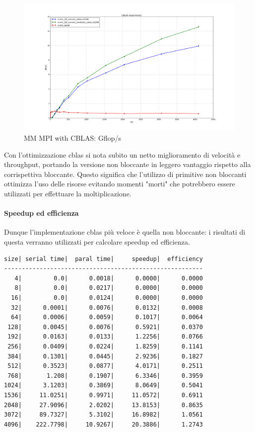 \begin{figure}[htbp]
    \begin{center}
        \includegraphics[width=15cm]{immagini/cblas_gflops.png}
    \end{center}
    \caption{MM MPI with CBLAS: Gflop/s}
    \label{fig:cblas_gflops}
\end{figure}

Con l'ottimizzazione cblas si nota subito un netto miglioramento di velocit\`{a} e throughput, portando la versione non bloccante in leggero vantaggio rispetto alla corrispettiva bloccante. Questo significa che l'utilizzo di primitive non bloccanti ottimizza l'uso delle risorse evitando momenti "morti" che potrebbero essere utilizzati per effettuare la moltiplicazione.

\paragraph{Speedup ed efficienza}

Dunque l'implementazione cblas pi\`{u} veloce \`{e} quella non bloccante: i risultati di questa verranno utilizzati per calcolare speedup ed efficienza.

\begin{lstlisting}
size| serial time|  paral time|     speedup|  efficiency
--------------------------------------------------------
   4|         0.0|      0.0018|      0.0000|      0.0000
   8|         0.0|      0.0217|      0.0000|      0.0000
  16|         0.0|      0.0124|      0.0000|      0.0000
  32|      0.0001|      0.0076|      0.0132|      0.0008
  64|      0.0006|      0.0059|      0.1017|      0.0064
 128|      0.0045|      0.0076|      0.5921|      0.0370
 192|      0.0163|      0.0133|      1.2256|      0.0766
 256|      0.0409|      0.0224|      1.8259|      0.1141
 384|      0.1301|      0.0445|      2.9236|      0.1827
 512|      0.3523|      0.0877|      4.0171|      0.2511
 768|       1.208|      0.1907|      6.3346|      0.3959
1024|      3.1203|      0.3869|      8.0649|      0.5041
1536|     11.0251|      0.9971|     11.0572|      0.6911
2048|     27.9096|      2.0202|     13.8153|      0.8635
3072|     89.7327|      5.3102|     16.8982|      1.0561
4096|    222.7798|     10.9267|     20.3886|      1.2743
\end{lstlisting}

